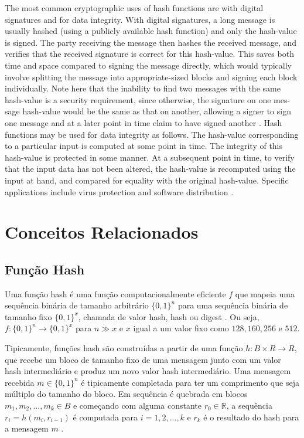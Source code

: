 \documentclass[12pt]{article}
\begin{document}
The most common cryptographic uses of hash functions are with digital signatures and
for data integrity.  With digital signatures, a long message is usually hashed (using a publicly 
available hash function) and only the hash-value is signed.  The party receiving the
message then hashes the received message, and verifies that the received signature is correct 
for this hash-value. This saves both time and space compared to signing the message
directly, which would typically involve splitting the message into appropriate-sized blocks
and signing each block individually. Note here that the inability to find two messages with
the same hash-value is a security requirement, since otherwise, the signature on one mes-
sage hash-value would be the same as that on another, allowing a signer to sign one message
and at a later point in time claim to have signed another \cite{menezes1996handbook}.
Hash functions may be used for data integrity as follows. The hash-value corresponding to a particular 
input is computed at some point in time. The integrity of this hash-value is protected in some manner. 
At a subsequent point in time, to verify that the input data has not been altered, the hash-value is 
recomputed using the input at hand, and compared for equality with the original hash-value. Specific 
applications include virus protection and software distribution \cite{menezes1996handbook}.
\fi

\section{Conceitos Relacionados} 

\subsection{Função Hash}

Uma função hash é uma função computacionalmente eficiente \(f\) que mapeia uma sequência binária de tamanho 
arbitrário \(\{0, 1\}^n\) para uma sequência binária de tamanho fixo \(\{0, 1\}^x\), chamada de valor hash, hash 
ou digest \cite{menezes1996handbook}. Ou seja, \(f : \{0, 1\}^n \to \{0, 1\}^x\) para \(n \gg x\) e \(x\) igual a 
um valor fixo como \(128, 160, 256\) e \(512\).

Tipicamente, funções hash são construídas a partir de uma função \(h: B \times R \to R\), que recebe um bloco 
de tamanho fixo de uma mensagem junto com um valor hash intermediário e produz um novo valor hash intermediário. 
Uma mensagem recebida \(m \in \{0, 1\}^n\) é tipicamente completada para ter um comprimento que seja múltiplo do 
tamanho do bloco. Em sequência é quebrada em blocos \(m_1, m_2, ... , m_k \in B\) e começando com alguma constante 
\(r_0 \in \mathbb{R}\), a sequência \(r_i = h(m_i, r_{i-1})\) é computada para \(i = 1, 2, ... , k\) e \(r_k\) é 
o resultado do hash para a mensagem \(m\) \cite{van1999parallel}.
\end{document}
